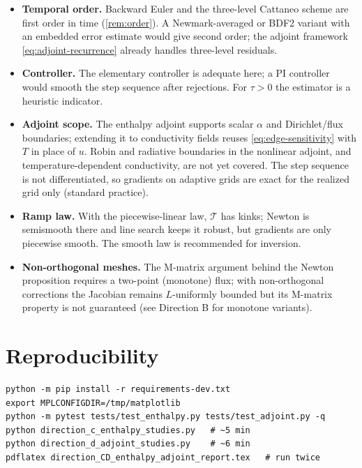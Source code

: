 \documentclass[11pt]{article}
\numberwithin{equation}{section}
\theoremstyle{remark}
\begin{document}
\begin{itemize}[leftmargin=*]
\item \textbf{Temporal order.}  Backward Euler and the three-level Cattaneo
  scheme are first order in time (\cref{rem:order}).  A Newmark-averaged or
  BDF2 variant with an embedded error estimate would give second order; the
  adjoint framework \eqref{eq:adjoint-recurrence} already handles three-level
  residuals.
\item \textbf{Controller.}  The elementary controller is adequate here; a PI
  controller \cite{soderlind2002} would smooth the step sequence after
  rejections.  For $\tau>0$ the estimator is a heuristic indicator.
\item \textbf{Adjoint scope.}  The enthalpy adjoint supports scalar $\alpha$
  and Dirichlet/flux boundaries; extending it to conductivity fields reuses
  \eqref{eq:edge-sensitivity} with $T$ in place of $u$.  Robin and radiative
  boundaries in the nonlinear adjoint, and temperature-dependent conductivity,
  are not yet covered.  The step sequence is not differentiated, so gradients
  on adaptive grids are exact for the realized grid only (standard practice).
\item \textbf{Ramp law.}  With the piecewise-linear law, $\mathcal T$ has kinks;
  Newton is semismooth there and line search keeps it robust, but gradients
  are only piecewise smooth.  The smooth law is recommended for inversion.
\item \textbf{Non-orthogonal meshes.}  The M-matrix argument behind the Newton
  proposition requires a two-point (monotone) flux; with non-orthogonal
  corrections the Jacobian remains $L$-uniformly bounded but its M-matrix
  property is not guaranteed (see Direction B for monotone variants).
\end{itemize}

\section{Reproducibility}

\begin{verbatim}
python -m pip install -r requirements-dev.txt
export MPLCONFIGDIR=/tmp/matplotlib
python -m pytest tests/test_enthalpy.py tests/test_adjoint.py -q
python direction_c_enthalpy_studies.py   # ~5 min
python direction_d_adjoint_studies.py    # ~6 min
pdflatex direction_CD_enthalpy_adjoint_report.tex   # run twice
\end{verbatim}
\end{document}
